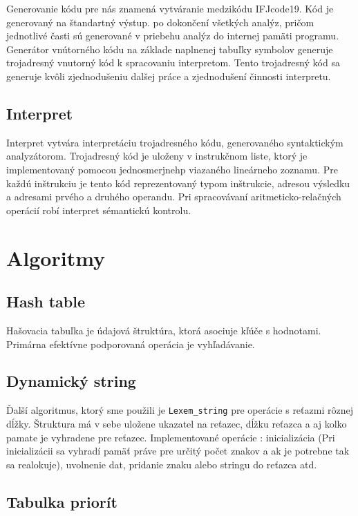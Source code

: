 \documentclass[a4paper, 11pt]{article}
\begin{document}
    Generovanie kódu pre nás znamená vytváranie medzikódu IFJcode19. Kód je generovaný na štandartný výstup. po dokončení všetkých analýz, pričom jednotlivé časti sú generované v priebehu analýz do internej pamäti programu. Generátor vnútorného kódu na základe naplnenej tabuľky symbolov generuje trojadresný vnutorný kód k spracovaniu interpretom. Tento trojadresný kód sa generuje kvôli zjednodušeniu dalšej práce a zjednodušení činnosti interpretu.
    
    \subsection{Interpret}
    
    Interpret vytvára interpretáciu trojadresného kódu, generovaného syntaktickým analyzátorom. Trojadresný kód je uloženy v instrukčnom liste, ktorý je implementovaný pomocou jednosmerjnehp viazaného lineárneho zoznamu. Pre každú inštrukciu je tento kód reprezentovaný typom inštrukcie, adresou výsledku a adresami prvého a druhého operandu. Pri spracovávaní aritmeticko-relačných operácií robí interpret sémantickú kontrolu.
    
    \pagebreak
    \section{Algoritmy}
    \subsection{Hash table}
    
    Hašovacia tabuľka je údajová štruktúra, ktorá asociuje kľúče s hodnotami. Primárna efektívne podporovaná operácia je vyhľadávanie.
    
    \subsection{Dynamický string}
    
    Ďalší algoritmus, ktorý sme použili je \texttt{Lexem\_string} pre operácie s reťazmi rôznej dĺžky. Štruktura má v sebe uložene ukazatel na reťazec, dĺžku reťazca a aj kolko pamate je vyhradene pre reťazec. Implementované operácie : inicializácia (Pri inicializácii sa vyhradí pamäť práve pre určitý počet znakov a ak je potrebne tak sa realokuje), uvolnenie dat, pridanie znaku alebo stringu do reťazca atd.
    
    \subsection{Tabulka priorít}
    
\end{document}
